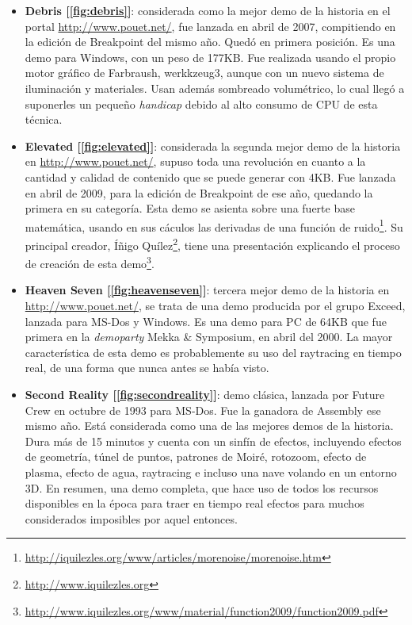 \begin{itemize}
	\item \textbf{Debris [\ref{fig:debris}]}: considerada como la mejor demo de la historia en el portal \url{http://www.pouet.net/}, fue lanzada en abril de 2007, compitiendo en la edición de Breakpoint del mismo año. Quedó en primera posición. Es una demo para Windows, con un peso de 177KB. Fue realizada usando el propio motor gráfico de Farbraush, werkkzeug3, aunque con un nuevo sistema de iluminación y materiales. Usan además sombreado volumétrico, lo cual llegó a suponerles un pequeño \emph{handicap} debido al alto consumo de CPU de esta técnica.
	\item \textbf{Elevated [\ref{fig:elevated}]}: considerada la segunda mejor demo de la historia en \url{http://www.pouet.net/}, supuso toda una revolución en cuanto a la cantidad y calidad de contenido que se puede generar con 4KB. Fue lanzada en abril de 2009, para la edición de Breakpoint de ese año, quedando la primera en su categoría. Esta demo se asienta sobre una fuerte base matemática, usando en sus cáculos las derivadas de una función de ruido\footnote{\url{http://iquilezles.org/www/articles/morenoise/morenoise.htm}}. Su principal creador, Íñigo Quílez\footnote{\url{http://www.iquilezles.org}}, tiene una presentación explicando el proceso de creación de esta demo\footnote{\url{http://www.iquilezles.org/www/material/function2009/function2009.pdf}}.
	\item \textbf{Heaven Seven [\ref{fig:heavenseven}]}: tercera mejor demo de la historia en \url{http://www.pouet.net/}, se trata de una demo producida por el grupo Exceed, lanzada para MS-Dos y Windows. Es una demo para PC de 64KB que fue primera en la \emph{demoparty} Mekka \& Symposium, en abril del 2000. La mayor característica de esta demo es probablemente su uso del raytracing en tiempo real, de una forma que nunca antes se había visto.
	\item \textbf{Second Reality [\ref{fig:secondreality}]}: demo clásica, lanzada por Future Crew en octubre de 1993 para MS-Dos. Fue la ganadora de Assembly ese mismo año. Está considerada como una de las mejores demos de la historia. Dura más de 15 minutos y cuenta con un sinfín de efectos, incluyendo efectos de geometría, túnel de puntos, patrones de Moiré, rotozoom, efecto de plasma, efecto de agua, raytracing e incluso una nave volando en un entorno 3D. En resumen, una demo completa, que hace uso de todos los recursos disponibles en la época para traer en tiempo real efectos para muchos considerados imposibles por aquel entonces. 

\end{itemize}

